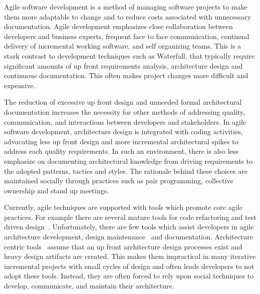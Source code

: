 








Agile software development is a method of managing software projects to make them more adaptable to change and to reduce costs associated with unnecessary documentation. Agile development emphasizes close collaboration between developers and business experts, frequent face to face communication, continual delivery of incremental working software, and self organizing teams. This is a stark contrast to development techniques such as Waterfall, that typically require significant amounts of up front requirements analysis, architecture design and continuous documentation. This often makes project changes more difficult and expensive.

The reduction of excessive up front design and unneeded formal architectural documentation increases the necessity for other methods of addressing quality, communication, and interactions between developers and stakeholders. In agile software development, architecture design is integrated with coding activities, advocating less up front design and more incremental architectural spikes to address each quality requirements. In such an environment, there is also less emphasize on documenting architectural knowledge from driving requirements to the adopted patterns, tactics and styles. The rationale behind these choices are maintained socially through practices such as pair programming, collective ownership and stand up meetings.

Currently, agile techniques are supported with tools which promote core agile practices. For example there are several mature tools for code refactoring and test driven design~\cite{Alves:2014:RRA:2635868.2661674, Moghadam:2011:CTA:1984732.1984742, Nongpong:2012:ICS:2519037}. Unfortunately, there are few tools which assist developers in agile architecture development, design maintenance~\cite{ICSE2012,Erosion} and documentation. Architecture centric tools~\cite{KA,AntonyTool,DBLP:conf/qosa/LeeK08} assume that an up front architecture design processes exist and heavy design artifacts are created. This makes them impractical in many iterative incremental projects with small cycles of design and often leads developers to not adopt these tools. Instead, they are often forced to rely upon social techniques to develop, communicate, and maintain their architecture.

